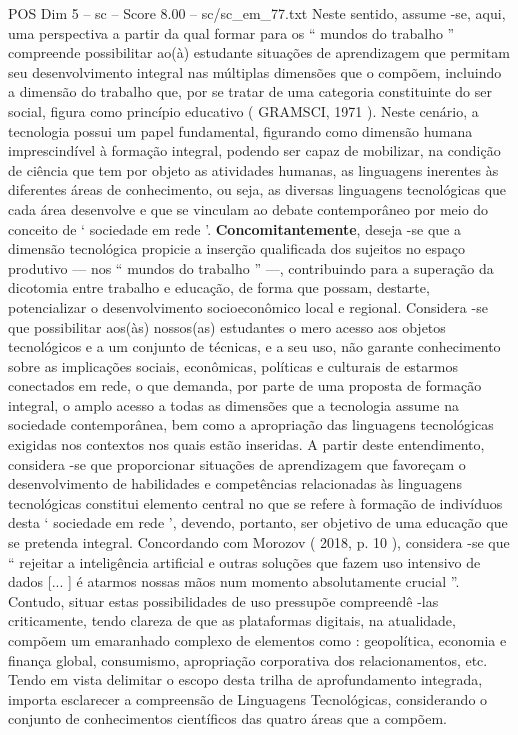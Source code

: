 \begin{textsample}{POS Dim 5 – sc – Score 8.00 – sc/sc\_em\_77.txt}
Neste sentido, assume -se, aqui, uma perspectiva a partir da qual formar para os “ mundos do trabalho ” compreende possibilitar ao(à) estudante situações de aprendizagem que permitam seu desenvolvimento integral nas múltiplas dimensões que o compõem, incluindo a dimensão do trabalho que, por se tratar de uma categoria constituinte do ser social, figura como princípio educativo ( GRAMSCI, 1971 ).
Neste cenário, a tecnologia possui um papel fundamental, figurando como dimensão humana imprescindível à formação integral, podendo ser capaz de mobilizar, na condição de ciência que tem por objeto as atividades humanas, as linguagens inerentes às diferentes áreas de conhecimento, ou seja, as diversas linguagens tecnológicas que cada área desenvolve e que se vinculam ao debate contemporâneo por meio do conceito de ‘ sociedade em rede ’. \textbf{Concomitantemente}, deseja -se que a dimensão tecnológica propicie a inserção qualificada dos sujeitos no espaço produtivo — nos “ mundos do trabalho ” —, contribuindo para a superação da dicotomia entre trabalho e educação, de forma que possam, destarte, potencializar o desenvolvimento socioeconômico local e regional.
Considera -se que possibilitar aos(às) nossos(as) estudantes o mero acesso aos objetos tecnológicos e a um conjunto de técnicas, e a seu uso, não garante conhecimento sobre as implicações sociais, econômicas, políticas e culturais de estarmos conectados em rede, o que demanda, por parte de uma proposta de formação integral, o amplo acesso a todas as dimensões que a tecnologia assume na sociedade contemporânea, bem como a apropriação das linguagens tecnológicas exigidas nos contextos nos quais estão inseridas.
A partir deste entendimento, considera -se que proporcionar situações de aprendizagem que favoreçam o desenvolvimento de habilidades e competências relacionadas às linguagens tecnológicas constitui elemento central no que se refere à formação de indivíduos desta ‘ sociedade em rede ’, devendo, portanto, ser objetivo de uma educação que se pretenda integral.
Concordando com Morozov ( 2018, p. 10 ), considera -se que “ rejeitar a inteligência artificial e outras soluções que fazem uso intensivo de dados [... ] é atarmos nossas mãos num momento absolutamente crucial ”.
Contudo, situar estas possibilidades de uso pressupõe compreendê -las criticamente, tendo clareza de que as plataformas digitais, na atualidade, compõem um emaranhado complexo de elementos como : geopolítica, economia e finança global, consumismo, apropriação corporativa dos relacionamentos, etc.
Tendo em vista delimitar o escopo desta trilha de aprofundamento integrada, importa esclarecer a compreensão de Linguagens Tecnológicas, considerando o conjunto de conhecimentos científicos das quatro áreas que a compõem.

\end{textsample}
